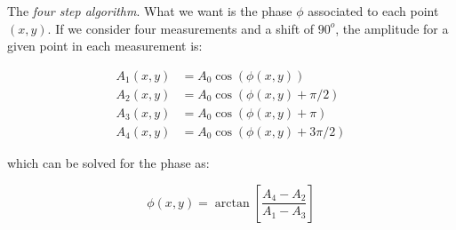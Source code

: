 \documentclass{article}
\begin{document}
The \emph{four step algorithm}.
What we want is the phase $\phi$ associated to each point $(x,y)$. If we consider four measurements and a shift of $90^o$, the amplitude for a given point in each measurement is:

\begin{align}
A_1(x,y)&=A_0\cos(\phi(x,y)) \\
A_2(x,y)&=A_0\cos(\phi(x,y)+\pi/2) \nonumber\\
A_3(x,y)&=A_0\cos(\phi(x,y)+\pi) \nonumber\\
A_4(x,y)&=A_0\cos(\phi(x,y)+3\pi/2) \nonumber
\end{align}

\noindent which can be solved for the phase as:

\begin{equation}
\phi(x,y)=\arctan\left[\frac{A_4-A_2}{A_1-A_3}\right]
\end{equation}
\end{document}
